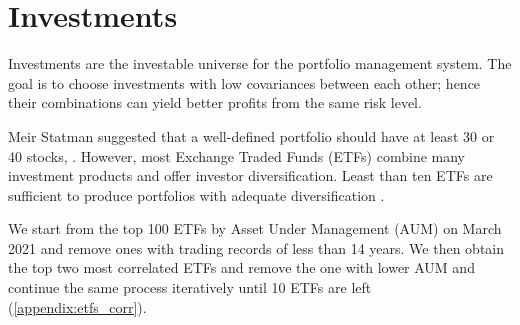 \section{Investments}
Investments are the investable universe for the portfolio management system. The goal is to choose investments with low covariances between each other; hence their combinations can yield better profits from the same risk level\cite{willenbrock2011diversification}. 
\par 
Meir Statman suggested that a well-defined portfolio should have at least 30 or 40 stocks,  \cite{statman1987many}. However, most Exchange Traded Funds (ETFs) combine many investment products and offer investor diversification. Least than ten ETFs are sufficient to produce portfolios with adequate diversification \cite{chang_2016}.
\par
We start from the top 100 ETFs by Asset Under Management (AUM) on March 2021 and remove ones with trading records of less than 14 years. We then obtain the top two most correlated ETFs and remove the one with lower AUM and continue the same process iteratively until 10 ETFs are left (\autoref{appendix:etfs_corr}).
\par